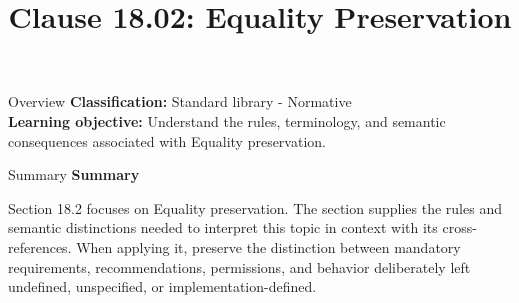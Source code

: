 \documentclass[10pt,letterpaper]{article}
\title{Clause 18.02: Equality Preservation}
\author{}
\date{}
\begin{document}
\maketitle
\begin{CornellOverviewBox}{Overview}
\textbf{Classification:} Standard library - Normative\\[2pt]
\textbf{Learning objective:} Understand the rules, terminology, and semantic consequences associated with Equality preservation.
\end{CornellOverviewBox}\begin{CornellSummaryBox}{Summary}
{\sffamily\bfseries\color{Accent} Summary}\par\vspace{3pt}Section 18.2 focuses on Equality preservation. The section supplies the rules and semantic distinctions needed to interpret this topic in context with its cross-references. When applying it, preserve the distinction between mandatory requirements, recommendations, permissions, and behavior deliberately left undefined, unspecified, or implementation-defined.
\end{CornellSummaryBox}
\end{document}
